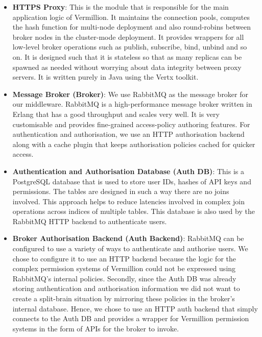 \documentclass[conference, 10pt]{IEEEtran}
\begin{document}
\begin{itemize}
\item \textbf{HTTPS Proxy}: This is the module that is responsible for the main application logic of Vermillion. It maintains the connection pools, computes the hash function for multi-node deployment and also round-robins between broker nodes in the cluster-mode deployment. It provides wrappers for all low-level broker operations such as publish, subscribe, bind, unbind and so on. It is designed such that it is stateless so that as many replicas can be spawned as needed without worrying about data integrity between proxy servers. It is written purely in Java using the Vertx toolkit.  

\item \textbf{Message Broker (Broker)}: We use RabbitMQ as the message broker for our middleware. RabbitMQ is a high-performance message broker written in Erlang \cite{ionescu2015analysis} that has a good throughput and scales very well\cite{rabbitisnice}. It is very customisable and provides fine-grained access-policy authoring features. For authentication and authorisation, we use an HTTP authorisation backend along with a cache plugin that keeps authorisation policies cached for quicker access.  

\item \textbf{Authentication and Authorisation Database (Auth DB)}: This is a PostgreSQL database that is used to store user IDs, hashes of API keys and permissions. The tables are designed in such a way there are no joins involved. This approach helps to reduce latencies involved in complex join operations across indices of multiple tables. This database is also used by the RabbitMQ HTTP backend to authenticate users.

\item \textbf{Broker Authorisation Backend (Auth Backend)}: RabbitMQ can be configured to use a variety of ways to authenticate and authorise users. We chose to configure it to use an HTTP backend because the logic for the complex permission systems of Vermillion could not be expressed using RabbitMQ's internal policies. Secondly, since the Auth DB was already storing authentication and authorisation information we did not want to create a split-brain situation by mirroring these policies in the broker's internal database. Hence, we chose to use an HTTP auth backend that simply connects to the Auth DB and provides a wrapper for Vermillion permission systems in the form of APIs for the broker to invoke.


\end{itemize}
\end{document}
